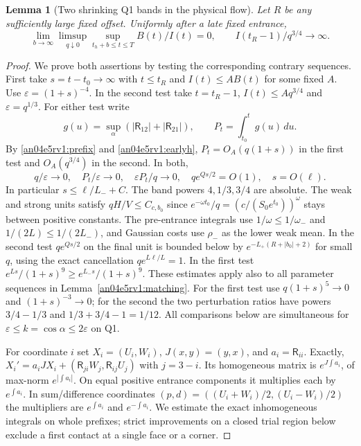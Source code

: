 \documentclass[11pt]{article}
\newtheorem{lemma}{Lemma}
\newcommand{\eps}{\varepsilon}
\begin{document}
\begin{lemma}[Two shrinking Q1 bands in the physical flow]\label{an04e5rv1:bandlemma}
Let $R$ be any sufficiently large fixed offset. Uniformly after a late fixed entrance,
\begin{equation}\label{an04e5rv1:uniform}
 \lim_{b\to\infty}\limsup_{q\downarrow0}\sup_{t_h+b\le t\le T} B(t)/I(t)=0 ,
 \qquad I(t_R-1)/q^{3/4}\longrightarrow\infty .
\end{equation}
\end{lemma}
\begin{proof}
We prove both assertions by testing the corresponding contrary sequences. First take $s=t-t_0\to\infty$ with $t\le t_R$ and $I(t)\le A B(t)$ for some fixed $A$. Use $\eps=(1+s)^{-4}$. In the second test take $t=t_R-1$, $I(t)\le A q^{3/4}$ and $\eps=q^{1/3}$. For either test write
\[
 g(u)=\sup_\alpha(|\mathsf R_{12}|+|\mathsf R_{21}|),\qquad
 P_t=\int_{t_0}^t g(u)\,du .
\]
By \eqref{an04e5rv1:prefix} and \eqref{an04e5rv1:earlyh}, $P_t=O_A(q(1+s))$ in the first test and $O_A(q^{3/4})$ in the second. In both,
\begin{equation}\label{an04e5rv1:units}
 q/\eps\to0,\quad P_t/\eps\to0,\quad
 \eps P_t/q\to0,\quad q e^{Qs/2}=O(1),\quad s=O(\ell).
\end{equation}
In particular $s\le\ell/L_-+C$. The band powers $4,1/3,3/4$ are absolute. The weak and strong units satisfy $qH/V\le C_{c,b_0}$ since $e^{-\omega t_0}/q=(c/(S_0e^{t_0}))^\omega$ stays between positive constants. The pre-entrance integrals use $1/\omega\le1/\omega_-$ and $1/(2L)\le1/(2L_-)$, and Gaussian costs use $\rho_-$ as the lower weak mean. In the second test $q e^{Qs/2}$ on the final unit is bounded below by $e^{-L_+(R+|b_0|+2)}$ for small $q$, using the exact cancellation $q e^{L\ell/L}=1$. In the first test $e^{Ls}/(1+s)^9\ge e^{L_-s}/(1+s)^9$. These estimates apply also to all parameter sequences in Lemma~\ref{an04e5rv1:matching}. For the first test use $q(1+s)^5\to0$ and $(1+s)^{-3}\to0$; for the second the two perturbation ratios have powers $3/4-1/3$ and $1/3+3/4-1=1/12$. All comparisons below are simultaneous for $\eps\le k=\cos\alpha\le2\eps$ on Q1.

For coordinate $i$ set $X_i=(U_i,W_i)$, $J(x,y)=(y,x)$, and $a_i=\mathsf R_{ii}$. Exactly,
$X_i'=a_i JX_i+(\mathsf R_{j i}W_j,\mathsf R_{i j}U_j)$ with $j=3-i$.
Its homogeneous matrix is $e^{J\int a_i}$, of max-norm $e^{|\int a_i|}$. On equal positive entrance components it multiplies each by $e^{\int a_i}$. In sum/difference coordinates $(p,d)=((U_i+W_i)/2,(U_i-W_i)/2)$ the multipliers are $e^{\int a_i}$ and $e^{-\int a_i}$. We estimate the exact inhomogeneous integrals on whole prefixes; strict improvements on a closed trial region below exclude a first contact at a single face or a corner.


\end{proof}
\end{document}
